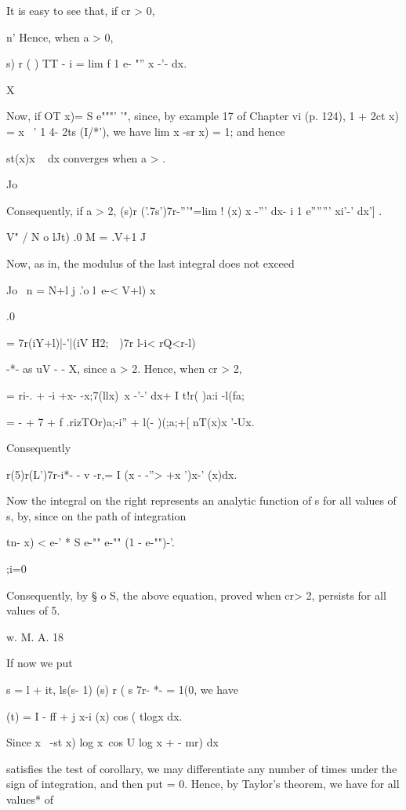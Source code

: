 %
%

It is easy to see that, if cr > 0,

n' Hence, when a > 0,

   s) r ( ) TT - i = lim f 1 e- "''  x -'- dx.

X

Now, if OT x)= S e"""' '", since, by example 17 of Chapter vi (p.
124), 1 + 2ct x) = x~ ' 1 4- 2ts (I/*'), we have lim x -sr x) = 1;
and hence

 st(x)x ~ dx converges when a > .

Jo

Consequently, if a > 2, (s)r ('.7s')7r-'''"=lim ! (x) x -''' dx- i 1
e''''''' xi'-' dx'] .

V" / N o lJt) .0 M = .V+1 J

Now, as in, the modulus of the last integral does not exceed

Jo \ n = N+l j .'o l\ e-< V+l) x

.0

= 7r(iY+l)|-'|(iV H2;\ \ )7r l-i< rQ<r-l)

-*- as uV - - X, since a > 2. Hence, when cr > 2,

= ri-. + -i +x- -x;7(llx)\ x -'-' dx+ I t!r( )a:i -l(fa;

= - + 7 + f .rizTOr)a;-i'' + l(- )(;a;+[ nT(x)x '-Ux.

Consequently

r(5)r(L')7r-i*- - v -r,= I (x - -''> +x ')x-' (x)dx.

Now the integral on the right represents an analytic function of s for
all values of s, by, since on the path of integration

tn- x) < e-' * S e-"" e-"" (1 - e-"")-'.

;i=0

Consequently, by § o S, the above equation, proved when cr> 2,
persists for all values of 5.

w. M. A.  18

%
%

If now we put

s = l + it, ls(s- 1) (s) r ( s 7r- *- = 1(0, we have

  (t) = I - ff + j x-i (x) cos ( tlogx dx.

Since x~ -st x) log x\ cos U log x + - mr) dx

satisfies the test of corollary, we may differentiate any
number of times under the sign of integration, and then put = 0.
Hence, by Taylor's theorem, we have for all values* of

